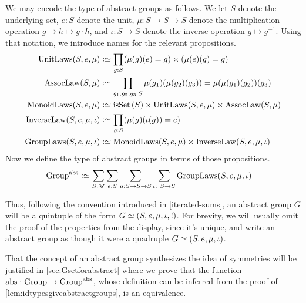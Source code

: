 \begin{remark}
  \label{rem:typemonoidabstrgp}
  We may encode the type of abstract groups as follows.  We let $S$ denote the underlying set, $e : S$ denote the unit, $\mu:S\to S\to S$ denote
  the multiplication operation $g \mapsto h \mapsto g \cdot h$, and $\iota : S \to S$ denote the inverse operation $g \mapsto g^{-1}$.  Using
  that notation, we introduce names for the relevant propositions.
  \begin{align*}
    \mathrm{UnitLaws}(S,e,\mu)   & \defequi\prod_{g:S} (\mu{}(g)(e) = g)\times(\mu{}(e)(g) = g) \\
    \mathrm{AssocLaw}(S,\mu{})   & \defequi\prod_{g_1,g_2,g_3:S} \mu{}(g_1)(\mu{}(g_2)(g_3))=\mu{}(\mu{}(g_1)(g_2))(g_3) \\
    \mathrm{MonoidLaws}(S,e,\mu) & \defequi \isset{(S)} \times \mathrm{UnitLaws}(S,e,\mu) \times \mathrm{AssocLaw}(S,\mu{}) \\
    \mathrm{InverseLaw}(S,e,\mu,\iota) & \defequi \prod_{g:S}(\mu(g)(\iota(g)) = e) \\
    \mathrm{GroupLaws}(S,e,\mu,\iota) & \defequi \mathrm{MonoidLaws}(S,e,\mu) \times \mathrm{InverseLaw}(S,e,\mu,\iota)
  \end{align*}
  Now we define the type of abstract groups in terms of those propositions.
  \begin{align*}
    \typegroup^\abstr \defequi \sum_{S:\UU} & \sum_{e:S}\sum_{\mu{}:S\to S\to S} \sum_{\iota\colon S\to S} \mathrm{GroupLaws}(S,e,\mu,\iota)
  \end{align*}

  Thus, following the convention introduced in \cref{iterated-sums}, an abstract group $G$ will be a quintuple of the form
  $G \jdeq (S,e,\mu,\iota,!)$.  For brevity, we will usually omit the proof of the properties from the display, since it's unique, and write an abstract
  group as though it were a quadruple $G \jdeq (S,e,\mu,\iota)$.
\end{remark}

\begin{remark}
  That the concept of an abstract group synthesizes the idea of symmetries will be justified in \cref{sec:Gsetforabstract} where we prove that
  the function $\mathrm{abs}:\mathrm{Group}\to\mathrm{Group}^{\mathrm{abs}}$, whose definition can be inferred from the proof of \cref{lem:idtypesgiveabstractgroups}, is an equivalence.
\end{remark}

